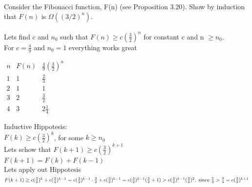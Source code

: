 \documentclass{article}
\begin{document}
Consider the Fibonacci function, F(n) (see Proposition 3.20). Show by
induction that $F(n)$ is $\Omega((3/2)^n)$.\\\\

Lets find $c$ and $n_{0}$ such that $F(n) \geq c(\frac{3}{2})^{n}$ for constant c and n $\geq n_0$.\\
For $c = \frac{4}{9}$ and $n_{0} = 1$ everything works great\\
\begin{center}
	$
	\begin{array}{ccc}
	n	& F(n) & \frac{4}{9} (\frac{3}{2})^n \\ 
	1	& 1 & \frac{2}{3} \\ 
	2	& 1 & 1 \\ 
	3	& 2 & \frac{3}{2} \\
	4	& 3 & 2\frac{1}{4}
	\end{array} 
	$
\end{center}
Inductive Hippotesis:\\
$F(k) \geq c(\frac{3}{2})^{k}$, for some $k \geq n_0$\\
Lets schow that $F(k+1) \geq c(\frac{3}{2})^{k+1}$\\

$F(k+1) = F(k) + F(k-1)$\\
Lets apply out Hippotesis\\
\begin{math}
F(k+1) \geq c(\frac{3}{2})^{k} + c(\frac{3}{2})^{k-1}\\
= c(\frac{3}{2})^{k-1}\cdot\frac{3}{2} + c(\frac{3}{2})^{k-1}\\
= c(\frac{3}{2})^{k-1}(\frac{3}{2}+1)\\
> c(\frac{3}{2})^{k-1}(\frac{3}{2})^{2}, \textnormal{ since } \frac{5}{2} > \frac{9}{4} \\
= c(\frac{3}{2})^{k+1}
\end{math}



	
\end{document}
